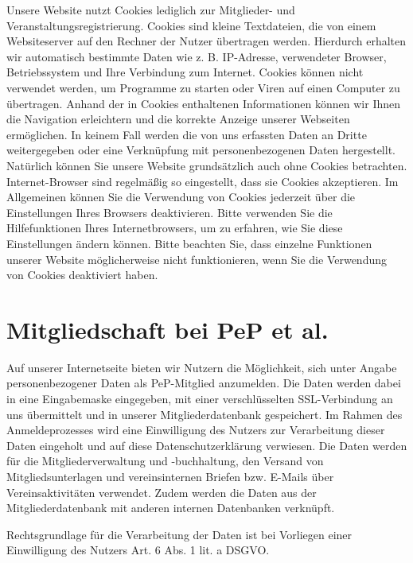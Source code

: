 \documentclass[
  fontsize=12pt,
  paper=a4,
  DIV14,
  parskip,
]{scrartcl}
\begin{document}
Unsere Website nutzt Cookies lediglich zur Mitglieder- und
Veranstaltungsregistrierung. Cookies sind kleine Textdateien, die von einem
Websiteserver auf den Rechner der Nutzer übertragen werden. Hierdurch
erhalten wir automatisch bestimmte Daten wie z. B. IP-Adresse, verwendeter
Browser, Betriebssystem und Ihre Verbindung zum Internet.
Cookies können nicht verwendet werden, um Programme zu starten oder Viren auf
einen Computer zu übertragen. Anhand der in Cookies enthaltenen Informationen
können wir Ihnen die Navigation erleichtern und die korrekte Anzeige unserer
Webseiten ermöglichen.
In keinem Fall werden die von uns erfassten Daten an Dritte weitergegeben
oder eine Verknüpfung mit personenbezogenen Daten hergestellt. Natürlich
können Sie unsere Website grundsätzlich auch ohne Cookies betrachten.
Internet-Browser sind regelmäßig so eingestellt, dass sie Cookies akzeptieren.
Im Allgemeinen können Sie die Verwendung von Cookies jederzeit über die
Einstellungen Ihres Browsers deaktivieren.
Bitte verwenden Sie die Hilfefunktionen Ihres Internetbrowsers, um zu
erfahren, wie Sie diese Einstellungen ändern können.
Bitte beachten Sie, dass einzelne Funktionen unserer Website möglicherweise
nicht funktionieren, wenn Sie die Verwendung von Cookies deaktiviert haben.

\section{Mitgliedschaft bei PeP et al.}

Auf unserer Internetseite bieten wir Nutzern die Möglichkeit, sich unter
Angabe personenbezogener Daten als PeP-Mitglied anzumelden.
Die Daten werden dabei in eine Eingabemaske eingegeben, mit einer
verschlüsselten SSL-Verbindung an uns übermittelt und in unserer
Mitgliederdatenbank gespeichert.
Im Rahmen des Anmeldeprozesses wird eine Einwilligung des Nutzers zur
Verarbeitung dieser Daten eingeholt und auf diese Datenschutzerklärung
verwiesen. 
Die Daten werden für die Mitgliederverwaltung und -buchhaltung, den Versand
von Mitgliedsunterlagen und vereinsinternen Briefen bzw. E-Mails über
Vereinsaktivitäten verwendet.
Zudem werden die Daten aus der Mitgliederdatenbank mit anderen internen
Datenbanken verknüpft.

Rechtsgrundlage für die Verarbeitung der Daten ist bei Vorliegen einer
Einwilligung des Nutzers Art. 6 Abs. 1 lit. a DSGVO.
\end{document}
